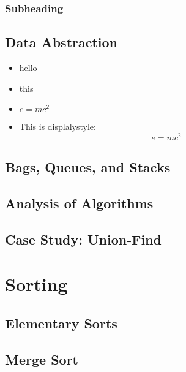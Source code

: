 \documentclass[11pt]{report}
\begin{document}
\section{Subheading}
\label{sec:orgddce2c6}
\chapter{Data Abstraction}
\label{sec:orgcd0363f}
\begin{itemize}
\item hello
\item this
\item \(e=mc^2\)
\item This is displalystyle: $$e=mc^2$$
\end{itemize}
\chapter{Bags, Queues, and Stacks}
\label{sec:org04da97d}
\chapter{Analysis of Algorithms}
\label{sec:org396321a}
\chapter{Case Study: Union-Find}
\label{sec:orgee36423}

\part{Sorting}
\label{sec:org7453878}
\chapter{Elementary Sorts}
\label{sec:org9e8586f}
\chapter{Merge Sort}
\label{sec:orgc1b7709}
\end{document}
